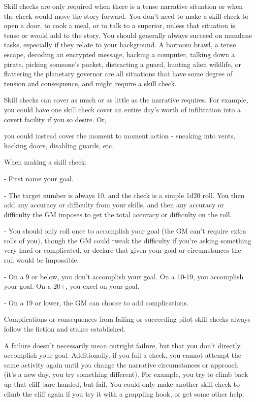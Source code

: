 Skill checks are only required when there is a tense narrative situation or when the check  
would move the story forward. You don’t need to make a skill check to open a door, to cook a  
meal, or to talk to a superior, unless that situation is tense or would add to the story. You should  
generally always succeed on mundane tasks, especially if they relate to your background. A  
barroom brawl, a tense escape, decoding an encrypted message, hacking a computer, talking  
down a pirate, picking someone’s pocket, distracting a guard, hunting alien wildlife, or flattering  
the planetary governor are all situations that have some degree of tension and consequence, and  
might require a skill check.
 

Skill checks can cover as much or as little as the narrative requires. For example, you could have  
one skill check cover an entire day’s worth of infiltration into a covert facility if you so desire. Or,  

                                                                                                                  


you could instead cover the moment to moment action - sneaking into vents, hacking doors,  
disabling guards, etc.  

When making a skill check:
 
    -    First name your goal. 
 
    -    The target number is always 10, and the check is a simple 1d20 roll. You then add any  
         accuracy or difficulty from your skills, and then any accuracy or difficulty the GM imposes  
         to get the total accuracy or difficulty on the roll.
 
    -    You should only roll once to accomplish your goal (the GM can’t require extra rolls of  
         you), though the GM could tweak the difficulty if you’re asking something very hard or  
         complicated, or declare that given your goal or circumstances the roll would be  
         impossible.
 
    -    On a 9 or below, you don’t accomplish your goal. On a 10-19, you accomplish your goal.  
         On a 20+, you excel on your goal.
 
    -    On a 19 or lower, the GM can choose to add complications.
 

Complications or consequences from failing or succeeding pilot skill checks always follow the  
fiction and stakes established.
 

A failure doesn’t necessarily mean outright failure, but that you don’t directly accomplish your  
goal. Additionally, if you fail a check, you cannot attempt the same activity again until you change  
the narrative circumstances or approach (it’s a new day, you try something different). For  
example, you try to climb back up that cliff bare-handed, but fail. You could only make another  
skill check to climb the cliff again if you try it with a grappling hook, or get some other help.
 

